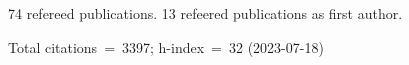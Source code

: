 74 refereed publications. 13 refeered publications as first author.

Total citations~=~3397; h-index~=~32 (2023-07-18)